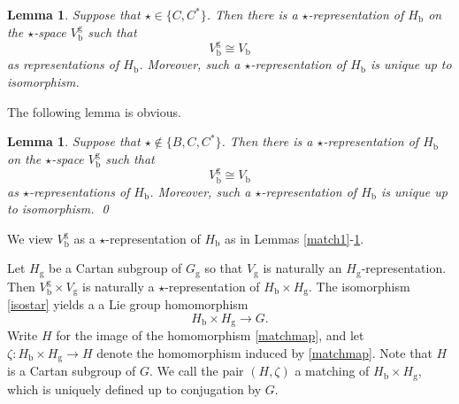 \documentclass[12pt,a4paper]{amsart}
\newcommand{\be}{\begin {equation}}
\newcommand{\ee}{\end {equation}}
\numberwithin{equation}{section}
\newtheorem{lem}[thm]{Lemma}
\theoremstyle{remark}
\begin{document}
 \begin{lem}\label{match2}
Suppose that $\star\in \{C, C^*\}$. Then  there is a $\star$-representation of $H_\mathrm b$  on the $\star$-space $V_\mathrm b^\mathrm g$ such that
\[
 V_\mathrm b^\mathrm g\cong V_\mathrm b
\]
as representations of $H_\mathrm b$. Moreover, such a $\star$-representation of $H_\mathrm b$ is unique up to isomorphism.

 \end{lem}


  The following lemma is obvious.
 \begin{lem}\label{match3}
Suppose that $\star\notin \{B, C, C^*\}$. Then  there is a $\star$-representation of $H_\mathrm b$  on the $\star$-space $V_\mathrm b^\mathrm g$ such that
\[
 V_\mathrm b^\mathrm g\cong V_\mathrm b
\]
as $\star$-representations of $H_\mathrm b$. Moreover, such a $\star$-representation of $H_\mathrm b$ is unique up to isomorphism.
\qed
 \end{lem}


We view  $V_\mathrm b^\mathrm g$  as a $\star$-representation of  $H_\mathrm b$ as in Lemmas \ref{match1}-\ref{match3}.



  Let $H_\mathrm g$ be a Cartan subgroup of $G_\mathrm g$ so that $V_\mathrm g$ is naturally an $H_\mathrm g$-representation.
Then $V_\mathrm b^\mathrm g\times V_\mathrm g$ is naturally a $\star$-representation of $H_\mathrm b\times H_\mathrm g$. The isomorphism \eqref{isostar} yields a
 a Lie group homomorphism
\be\label{matchmap}
H_\mathrm b\times H_\mathrm g\rightarrow G.
\ee
Write $H$ for the image of the homomorphism \eqref{matchmap}, and let $\zeta: H_\mathrm b\times H_\mathrm g\rightarrow H$ denote the homomorphism induced by \eqref{matchmap}.
Note that $H$ is a Cartan subgroup of $G$. We call the pair $(H, \zeta)$ a matching of $H_\mathrm b\times H_\mathrm g$, which is uniquely defined up to conjugation by $G$.
\end{document}
